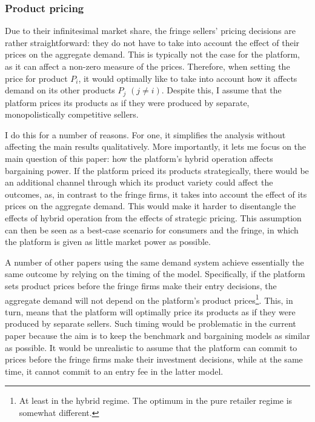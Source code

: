 \subsubsection{Product pricing}

Due to their infinitesimal market share, the fringe sellers' pricing decisions are rather straightforward: they do not have to take into account the effect of their prices on the aggregate demand.
This is typically not the case for the platform, as it can affect a non-zero measure of the prices.
Therefore, when setting the price for product $P_i$, it would optimally like to take into account how it affects demand on its other products $P_j$ $(j \neq i)$.
Despite this, I assume that the platform prices its products as if they were produced by separate, monopolistically competitive sellers.

I do this for a number of reasons.
For one, it simplifies the analysis without affecting the main results qualitatively.
More importantly, it lets me focus on the main question of this paper: how the platform's hybrid operation affects bargaining power.
If the platform priced its products strategically, there would be an additional channel through which its product variety could affect the outcomes, as, in contrast to the fringe firms, it takes into account the effect of its prices on the aggregate demand.
This would make it harder to disentangle the effects of hybrid operation from the effects of strategic pricing.
This assumption can then be seen as a best-case scenario for consumers and the fringe, in which the platform is given as little market power as possible.

A number of other papers using the same demand system \parencite[e.g.][]{anderson2020aggregative,anderson2021hybrid} achieve essentially the same outcome by relying on the timing of the model.
Specifically, if the platform sets product prices before the fringe firms make their entry decisions, the aggregate demand will not depend on the platform's product prices\footnote{
 At least in the hybrid regime.
 The optimum in the pure retailer regime is somewhat different.
}.
This, in turn, means that the platform will optimally price its products as if they were produced by separate sellers.
Such timing would be problematic in the current paper because the aim is to keep the benchmark and bargaining models as similar as possible.
It would be unrealistic to assume that the platform can commit to prices before the fringe firms make their investment decisions, while at the same time, it cannot commit to an entry fee in the latter model.

